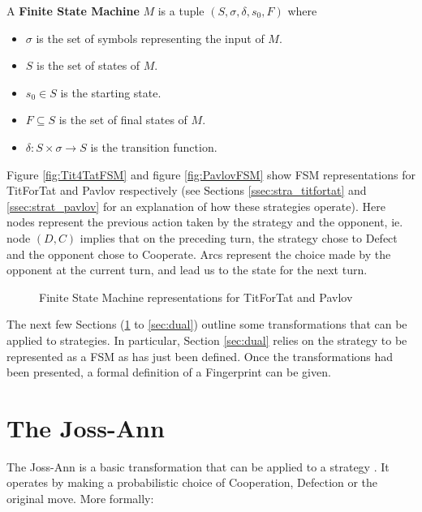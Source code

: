 \begin{definition}\label{def:fsm}
A \textbf{Finite State Machine} $M$ is a tuple $(S, \sigma, \delta, s_0, F)$ where
\begin{itemize}
 \item $\sigma$ is the set of symbols representing the input of $M$.
 \item $S$ is the set of states of $M$.
 \item $s_0 \in S$ is the starting state.
 \item $F \subseteq S$ is the set of final states of $M$.
 \item $\delta: S \times \sigma \rightarrow S$ is the transition function.
\end{itemize}
\end{definition}

Figure \ref{fig:Tit4TatFSM} and figure \ref{fig:PavlovFSM} show FSM representations for TitForTat and Pavlov respectively (see Sections \ref{ssec:stra_titfortat} and \ref{ssec:strat_pavlov} for an explanation of how these strategies operate).
Here nodes represent the previous action taken by the strategy and the opponent, ie. node $(D, C)$ implies that on the preceding turn, the strategy chose to Defect and the opponent chose to Cooperate.
Arcs represent the choice made by the opponent at the current turn, and lead us to the state for the next turn.

\begin{figure}[hbtp!]
\centering
{}
\caption{Finite State Machine representations for TitForTat and Pavlov}
\end{figure}

The next few Sections (\ref{sec:joss-ann} to \ref{sec:dual}) outline some transformations that can be applied to strategies.
In particular, Section \ref{sec:dual} relies on the strategy to be represented as a FSM as has just been defined.
Once the transformations had been presented, a formal definition of a Fingerprint can be given.



\section{The Joss-Ann}\label{sec:joss-ann}
The Joss-Ann is a basic transformation that can be applied to a strategy \cite{Ashlock2008, Ashlock2010, Ashlock2004,  Ashlock2005, Ashlock2009, Ashlock2006}.
It operates by making a probabilistic choice of Cooperation, Defection or the original move.
More formally:

